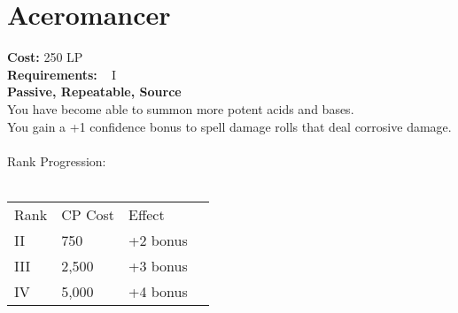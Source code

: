 \section{Aceromancer}\label{perk:aceromancer}
\textbf{Cost:} 250 LP\\
\textbf{Requirements:} ~ I\\
\textbf{Passive, Repeatable, Source}\\
You have become able to summon more potent acids and bases.\\
You gain a +1 confidence bonus to spell damage rolls that deal corrosive damage.\\
\\
Rank Progression:\\
\\
\begin{longtable}{l | l | l | l}
    Rank & CP Cost  &  Effect\\
    II & 750 & +2 bonus\\
    III & 2,500 & +3 bonus\\
    IV & 5,000 & +4 bonus\\
\end{longtable}
